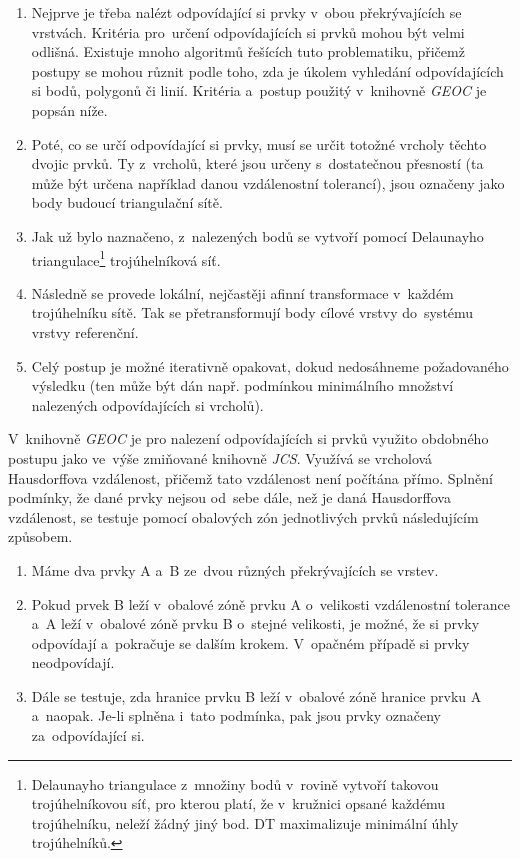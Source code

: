 \begin{enumerate}
 \item Nejprve je třeba nalézt odpovídající si prvky v~obou překrývajících se 
    vrstvách. Kritéria pro~určení odpovídajících si prvků mohou být velmi 
    odlišná. Existuje mnoho algoritmů řešících tuto problematiku, přičemž 
    postupy se mohou různit podle toho, zda je úkolem vyhledání 
    odpovídajících si bodů, polygonů či linií. Kritéria a~postup použitý 
    v~knihovně \textit{GEOC} je popsán níže.
 \item Poté, co se určí odpovídající si prvky, musí se určit totožné vrcholy 
    těchto dvojic prvků. Ty z~vrcholů, které jsou určeny s~dostatečnou 
    přesností (ta může být určena například danou vzdálenostní tolerancí), 
    jsou označeny jako body budoucí triangulační sítě.
 \item Jak už bylo naznačeno, z~nalezených bodů se vytvoří pomocí Delaunayho 
    triangulace\footnote{Delaunayho triangulace z~množiny bodů v~rovině vytvoří takovou 
    trojúhelníkovou síť, pro kterou platí, že v~kružnici opsané každému
    trojúhelníku, neleží žádný jiný bod. DT maximalizuje
    minimální úhly trojúhelníků.} trojúhelníková síť. 
 \item Následně se provede lokální, nejčastěji afinní transformace v~každém 
    trojúhelníku sítě. Tak se přetransformují body cílové vrstvy do~systému 
    vrstvy referenční.
 \item Celý postup je možné iterativně opakovat, dokud nedosáhneme 
    požadovaného výsledku (ten může být dán např. podmínkou minimálního 
    množství nalezených odpovídajících si vrcholů).
\end{enumerate}

V~knihovně \textit{GEOC} je pro nalezení odpovídajících si prvků využito 
obdobného postupu jako ve~výše zmiňované knihovně \textit{JCS}. Využívá 
se vrcholová Hausdorffova vzdálenost, přičemž tato vzdálenost není počítána 
přímo. Splnění podmínky, že dané prvky nejsou od~sebe dále, než je daná 
Hausdorffova vzdálenost, se testuje pomocí obalových zón jednotlivých prvků 
následujícím způsobem.

\begin{enumerate}
 \item Máme dva prvky A a~B ze~dvou různých překrývajících se vrstev.
 \item Pokud prvek B leží v~obalové zóně prvku A o~velikosti vzdálenostní 
    tolerance a~A leží v~obalové zóně prvku B o~stejné velikosti, je možné, 
    že si prvky odpovídají a~pokračuje se dalším krokem. V~opačném případě 
    si prvky neodpovídají.
 \item Dále se testuje, zda hranice prvku B leží v~obalové zóně hranice prvku
    A a~naopak. Je-li splněna i~tato podmínka, pak jsou prvky označeny 
    za~odpovídající si.
\end{enumerate}

